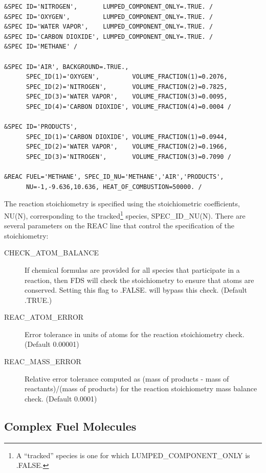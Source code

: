 \documentclass[11pt]{book}
\begin{document}
\begin{lstlisting}
&SPEC ID='NITROGEN',       LUMPED_COMPONENT_ONLY=.TRUE. /
&SPEC ID='OXYGEN',         LUMPED_COMPONENT_ONLY=.TRUE. /
&SPEC ID='WATER VAPOR',    LUMPED_COMPONENT_ONLY=.TRUE. /
&SPEC ID='CARBON DIOXIDE', LUMPED_COMPONENT_ONLY=.TRUE. /
&SPEC ID='METHANE' /

&SPEC ID='AIR', BACKGROUND=.TRUE.,
      SPEC_ID(1)='OXYGEN',         VOLUME_FRACTION(1)=0.2076,
      SPEC_ID(2)='NITROGEN',       VOLUME_FRACTION(2)=0.7825,
      SPEC_ID(3)='WATER VAPOR',    VOLUME_FRACTION(3)=0.0095,
      SPEC_ID(4)='CARBON DIOXIDE', VOLUME_FRACTION(4)=0.0004 /

&SPEC ID='PRODUCTS',
      SPEC_ID(1)='CARBON DIOXIDE', VOLUME_FRACTION(1)=0.0944,
      SPEC_ID(2)='WATER VAPOR',    VOLUME_FRACTION(2)=0.1966,
      SPEC_ID(3)='NITROGEN',       VOLUME_FRACTION(3)=0.7090 /

&REAC FUEL='METHANE', SPEC_ID_NU='METHANE','AIR','PRODUCTS',
      NU=-1,-9.636,10.636, HEAT_OF_COMBUSTION=50000. /
\end{lstlisting}

\noindent
The reaction stoichiometry is specified using the stoichiometric coefficients, {\ct NU(N)}, corresponding to the tracked\footnote{A ``tracked'' species is one for which {\ct LUMPED\_COMPONENT\_ONLY} is {\ct .FALSE.}} species, {\ct SPEC\_ID\_NU(N)}. There are several parameters on the {\ct REAC} line that control the specification of the stoichiometry:
\begin{description}
\item[{\ct CHECK\_ATOM\_BALANCE}] If chemical formulas are provided for all species that participate in a reaction, then FDS will check the stoichiometry to ensure that atoms are conserved.  Setting this flag to {\ct .FALSE.} will bypass this check.  (Default {\ct .TRUE.})
\item[{\ct REAC\_ATOM\_ERROR}] Error tolerance in units of atoms for the reaction stoichiometry check.  (Default 0.00001)
\item[{\ct REAC\_MASS\_ERROR}] Relative error tolerance computed as (mass of products - mass of reactants)/(mass of products) for the reaction stoichiometry mass balance check.  (Default 0.0001)
\end{description}



\subsection{Complex Fuel Molecules}
\end{document}
